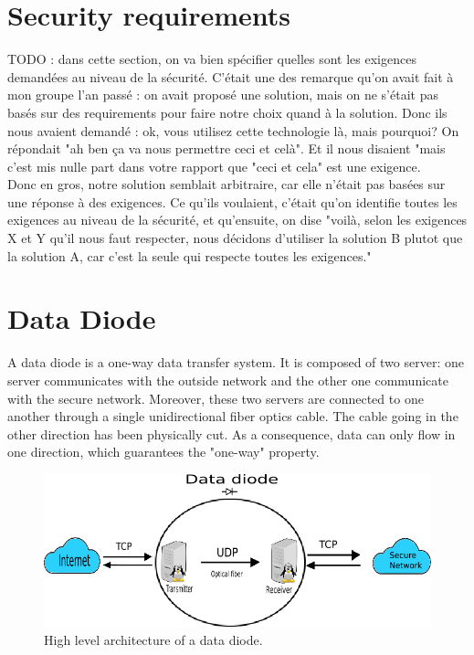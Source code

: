 \documentclass[a4paper,11pt]{article}
\begin{document}
\section{Security requirements}
TODO : dans cette section, on va bien spécifier quelles sont les exigences demandées au niveau de la sécurité. C'était une des remarque qu'on avait fait à mon groupe l'an passé : on avait proposé une solution, mais on ne s'était pas basés sur des requirements pour faire notre choix quand à la solution. Donc ils nous avaient demandé : ok, vous utilisez cette technologie là, mais pourquoi? On répondait "ah ben ça va nous permettre ceci et celà". Et il nous disaient "mais c'est mis nulle part dans votre rapport que "ceci et cela" est une exigence.\\

Donc en gros, notre solution semblait arbitraire, car elle n'était pas basées sur une réponse à des exigences. Ce qu'ils voulaient, c'était qu'on identifie toutes les exigences au niveau de la sécurité, et qu'ensuite, on dise "voilà, selon les exigences X et Y qu'il nous faut respecter, nous décidons d'utiliser la solution B plutot que la solution A, car c'est la seule qui respecte toutes les exigences."

\section{Data Diode}
\label{sec:data-diode}
A data diode is a one-way data transfer system. It is composed of two server: one server communicates with the outside network and the other one communicate with the secure network. Moreover, these two servers are connected to one another through a single unidirectional fiber optics cable. The cable going in the other direction has been physically cut. As a consequence, data can only flow in one direction, which guarantees the "one-way" property.

\begin{figure}
	\includegraphics[scale=0.7]{img/network.png}
	\caption{High level architecture of a data diode.}
\end{figure}
\end{document}
